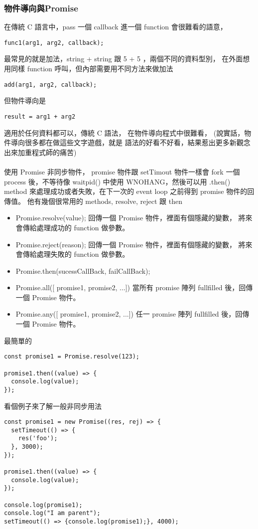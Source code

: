   \subsubsection{物件導向與Promise}
  在傳統 C 語言中，pass 一個 callback 進一個 function 會很難看的語意，
  \begin{verbatim}
func1(arg1, arg2, callback);
  \end{verbatim}
  最常見的就是加法，string + string 跟  5 + 5 ，兩個不同的資料型別，
  在外面想用同樣 function 呼叫，但內部需要用不同方法來做加法
  \begin{verbatim}
add(arg1, arg2, callback);
  \end{verbatim}
  但物件導向是
  \begin{verbatim}
result = arg1 + arg2
  \end{verbatim}
  適用於任何資料都可以，傳統 C 語法， 在物件導向程式中很難看，
  (說實話，物件導向很多都在做這些文字遊戲，就是
  語法的好看不好看，結果惹出更多新觀念出來加重程式師的痛苦)
  \\\\
  使用 Promise 非同步物件， promise 物件跟 setTimout 物件一樣會 fork 一個
  process 後，不等待像 waitpid() 中使用 WNOHANG，然後可以用 .then() method
  來處理成功或者失敗，在下一次的 event loop 之前得到 promise 物件的回傳值。
  他有幾個很常用的 methods, resolve, reject 跟 then
  \begin{itemize}
    \item Promise.resolve(value); 回傳一個 Promise 物件，裡面有個隱藏的變數，
      將來會傳給處理成功的 function 做參數。
    \item Promise.reject(reason); 回傳一個 Promise 物件，裡面有個隱藏的變數，
      將來會傳給處理失敗的 function 做參數。
    \item Promise.then(sucessCallBack, failCallBack);
    \item Promise.all([ promise1, promise2, ...]) 當所有 promise 陣列
      fullfilled 後，回傳一個 Promise 物件。
    \item Promise.any([ promise1, promise2, ...]) 任一 promise 陣列
      fullfilled 後，回傳一個 Promise 物件。
  \end{itemize}
  最簡單的
  \begin{verbatim}
const promise1 = Promise.resolve(123);

promise1.then((value) => {
  console.log(value);
});
  \end{verbatim}
  看個例子來了解一般非同步用法
  \begin{verbatim}
const promise1 = new Promise((res, rej) => {
  setTimeout(() => {
    res('foo');
  }, 3000);
});

promise1.then((value) => {
  console.log(value);
});

console.log(promise1);
console.log("I am parent");
setTimeout(() => {console.log(promise1);}, 4000);
  \end{verbatim}
